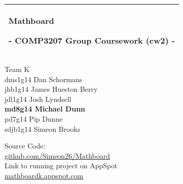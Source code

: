 %
%
%
%
%
\begin{titlepage}
  \addtolength{\hoffset}{0.5\evensidemargin-0.5\oddsidemargin} %
  \noindent%
  \begin{tabular}{@{}p{\textwidth}@{}}
    \toprule[2pt]
    \midrule
    \vspace{0.2cm}
    \begin{center}
    \Huge{\textbf{
      Mathboard%
    }}
    \end{center}
    \begin{center}
      \Large{
        - COMP3207 Group Coursework (cw2) -%
      }
    \end{center}
    \vspace{0.2cm}\\
    \midrule
    \toprule[2pt]
  \end{tabular}
  \vspace{4 cm}
  \begin{center}
    {\large
      Team K
    }\\
    \vspace{0.2cm}
    {\Large
      dms1g14 Dan Schormans\\
      jhb1g14 James Hueston Berry\\
      jdl1g14 Josh Lyndsell\\
      \textbf{md8g14 Michael Dunn}\\
      pd7g14 Pip Dunne\\
      sdjb1g14 Simeon Brooks
    }
  \end{center}
  \vfill
  \begin{center}
  Source Code:\\
  \href{https://github.com/Simeon26/Mathboard}{github.com/Simeon26/Mathboard}\\
  \vspace{5mm}
  Link to running project on AppSpot\\
  \href{https://mathboardk.appspot.com/}{mathboardk.appspot.com}
  \end{center}
\end{titlepage}
\clearpage